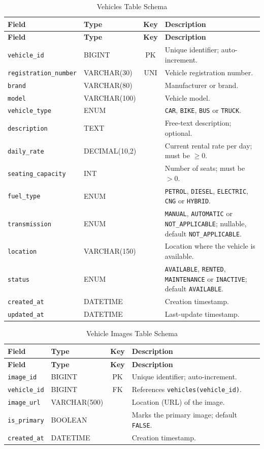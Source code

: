 \documentclass[10pt,a4paper]{report}
\newcommand{\col}[1]{\texttt{#1}}
\begin{document}
{\begin{longtable}{@{}llc>{\raggedright\arraybackslash}p{6.6cm}@{}}
\caption{Vehicles Table Schema}\label{tab:vehicles}\\
\toprule \textbf{Field} & \textbf{Type} & \textbf{Key} & \textbf{Description}\\ \midrule \endfirsthead
\toprule \textbf{Field} & \textbf{Type} & \textbf{Key} & \textbf{Description}\\ \midrule \endhead
\bottomrule \endfoot
\col{vehicle_id} & BIGINT & PK & Unique identifier; auto-increment.\\
\col{registration_number} & VARCHAR(30) & UNI & Vehicle registration number.\\
\col{brand} & VARCHAR(80) & & Manufacturer or brand.\\
\col{model} & VARCHAR(100) & & Vehicle model.\\
\col{vehicle_type} & ENUM & & \col{CAR}, \col{BIKE}, \col{BUS} or \col{TRUCK}.\\
\col{description} & TEXT & & Free-text description; optional.\\
\col{daily_rate} & DECIMAL(10,2) & & Current rental rate per day; must be $\geq 0$.\\
\col{seating_capacity} & INT & & Number of seats; must be $> 0$.\\
\col{fuel_type} & ENUM & & \col{PETROL}, \col{DIESEL}, \col{ELECTRIC}, \col{CNG} or \col{HYBRID}.\\
\col{transmission} & ENUM & & \col{MANUAL}, \col{AUTOMATIC} or \col{NOT_APPLICABLE}; nullable, default \col{NOT_APPLICABLE}.\\
\col{location} & VARCHAR(150) & & Location where the vehicle is available.\\
\col{status} & ENUM & & \col{AVAILABLE}, \col{RENTED}, \col{MAINTENANCE} or \col{INACTIVE}; default \col{AVAILABLE}.\\
\col{created_at} & DATETIME & & Creation timestamp.\\
\col{updated_at} & DATETIME & & Last-update timestamp.\\
\end{longtable}

\begin{longtable}{@{}llc>{\raggedright\arraybackslash}p{6.6cm}@{}}
\caption{Vehicle Images Table Schema}\label{tab:images}\\
\toprule \textbf{Field} & \textbf{Type} & \textbf{Key} & \textbf{Description}\\ \midrule \endfirsthead
\toprule \textbf{Field} & \textbf{Type} & \textbf{Key} & \textbf{Description}\\ \midrule \endhead
\bottomrule \endfoot
\col{image_id} & BIGINT & PK & Unique identifier; auto-increment.\\
\col{vehicle_id} & BIGINT & FK & References \col{vehicles(vehicle_id)}.\\
\col{image_url} & VARCHAR(500) & & Location (URL) of the image.\\
\col{is_primary} & BOOLEAN & & Marks the primary image; default \col{FALSE}.\\
\col{created_at} & DATETIME & & Creation timestamp.\\
\end{longtable}

}
\end{document}
